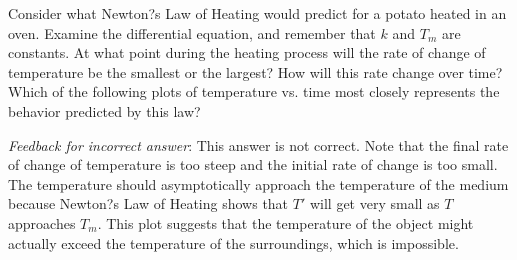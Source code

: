 \documentclass{ximera}
\begin{document}
Consider what Newton?s Law of Heating would predict for a potato heated in an oven.  Examine the differential equation, and remember that $k$ and $T_m$ are constants.  At what point during the heating process will the rate of change of temperature be the smallest or the largest?  How will this rate change over time?  Which of the following plots of temperature vs. time most closely represents the behavior predicted by this law?


\emph{Feedback for incorrect answer}: This answer is not correct.  Note that the final rate of change of temperature is too steep and the initial rate of change is too small.  The temperature should asymptotically approach the temperature of the medium because Newton?s Law of Heating shows that $T'$ will get very small as $T$ approaches $T_m$.  This plot suggests that the temperature of the object might actually exceed the temperature of the surroundings, which is impossible.
\end{document}
